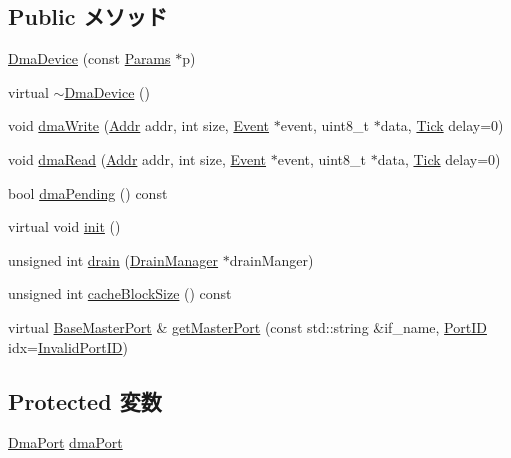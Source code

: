 \subsection*{Public メソッド}
\begin{DoxyCompactItemize}
\item 
\hyperlink{classDmaDevice_af4b097d003744f742495ee91bee709da}{DmaDevice} (const \hyperlink{classDmaDevice_aea7daf6105ab956443385f5f5a9b88c5}{Params} $\ast$p)
\item 
virtual \hyperlink{classDmaDevice_a28cd9afaa9eacf209f0380ffcce5ec72}{$\sim$DmaDevice} ()
\item 
void \hyperlink{classDmaDevice_a4a2db8a9eb52a00a9a2e19c2eb3753dc}{dmaWrite} (\hyperlink{base_2types_8hh_af1bb03d6a4ee096394a6749f0a169232}{Addr} addr, int size, \hyperlink{classEvent}{Event} $\ast$event, uint8\_\-t $\ast$data, \hyperlink{base_2types_8hh_a5c8ed81b7d238c9083e1037ba6d61643}{Tick} delay=0)
\item 
void \hyperlink{classDmaDevice_a8ca93dacaa427cede08842a958aa1b23}{dmaRead} (\hyperlink{base_2types_8hh_af1bb03d6a4ee096394a6749f0a169232}{Addr} addr, int size, \hyperlink{classEvent}{Event} $\ast$event, uint8\_\-t $\ast$data, \hyperlink{base_2types_8hh_a5c8ed81b7d238c9083e1037ba6d61643}{Tick} delay=0)
\item 
bool \hyperlink{classDmaDevice_a481b9352c138101d0f84f163a760c6e5}{dmaPending} () const 
\item 
virtual void \hyperlink{classDmaDevice_a02fd73d861ef2e4aabb38c0c9ff82947}{init} ()
\item 
unsigned int \hyperlink{classDmaDevice_a6bf479c521c7c3eb473822d953275b26}{drain} (\hyperlink{classDrainManager}{DrainManager} $\ast$drainManger)
\item 
unsigned int \hyperlink{classDmaDevice_a3e6e4aa434d2b5c83de3660307a49001}{cacheBlockSize} () const 
\item 
virtual \hyperlink{classBaseMasterPort}{BaseMasterPort} \& \hyperlink{classDmaDevice_adc4e675e51defbdd1e354dac729d0703}{getMasterPort} (const std::string \&if\_\-name, \hyperlink{base_2types_8hh_acef4d7d41cb21fdc252e20c04cd7bb8e}{PortID} idx=\hyperlink{base_2types_8hh_a65bf40f138cf863f0c5e2d8ca1144126}{InvalidPortID})
\end{DoxyCompactItemize}
\subsection*{Protected 変数}
\begin{DoxyCompactItemize}
\item 
\hyperlink{classDmaPort}{DmaPort} \hyperlink{classDmaDevice_a0e844de222006d2f1aadb8f01d8f383b}{dmaPort}
\end{DoxyCompactItemize}


